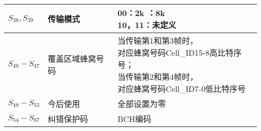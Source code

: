 \begin{table}[!htbp]
\begin{tabular}{|m{2cm}<{\centering}|m{3cm}<{\centering}|m{8cm}<{\centering}|}
	\hline
	$S_{38},S_{39}$ & 传输模式 & \tabincell{c}{00：2k \qquad 01：8k \\ 10，11：未定义} \\
	\hline
	$S_{40}-S_{47}$ & 覆盖区域蜂窝号码 & \tabincell{l}{当传输第1和第3帧时，\\对应蜂窝号码Cell\_ID15-8高比特序号； \\ 当传输第2和第4帧时，\\对应蜂窝号码Cell\_ID7-0低比特序号} \\
	\hline
	$S_{48}-S_{53}$ & 今后使用 & 全部设置为零 \\
	\hline
	$S_{54}-S_{67}$ & 纠错保护码 & BCH编码 \\
	\hline\hline
	\end{tabular}
	\label{table:tps}
\end{table}

\endinput